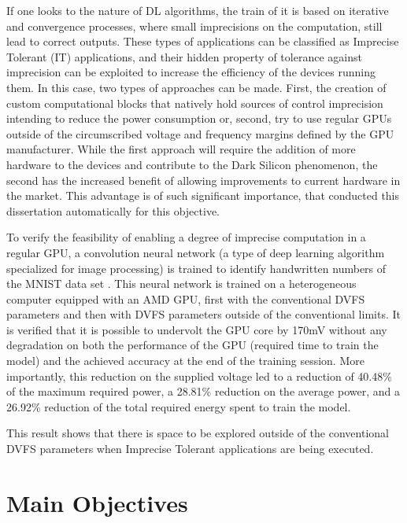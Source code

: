 If one looks to the nature of DL algorithms, the train of it is based on iterative and convergence processes, where small imprecisions on the computation, still lead to correct outputs. These types of applications can be classified as Imprecise Tolerant (IT) applications, and their hidden property of tolerance against imprecision can be exploited to increase the efficiency of the devices running them. In this case, two types of approaches can be made. First, the creation of custom computational blocks that natively hold sources of control imprecision intending to reduce the power consumption \cite{mahdiani_efficient_2017} or, second, try to use regular GPUs outside of the circumscribed voltage and frequency margins defined by the GPU manufacturer. While the first approach will require the addition of more hardware to the devices and contribute to the Dark Silicon phenomenon, the second has the increased benefit of allowing improvements to current hardware in the market. This advantage is of such significant importance, that conducted this dissertation automatically for this objective.

To verify the feasibility of enabling a degree of imprecise computation in a regular GPU, a convolution neural network (a type of deep learning algorithm specialized for image processing) is trained to identify handwritten numbers of the MNIST data set \cite{noauthor_mnist_nodate}. This neural network is trained on a heterogeneous computer equipped with an AMD GPU, first with the conventional DVFS parameters and then with DVFS parameters outside of the conventional limits. It is verified that it is possible to undervolt the GPU core by 170mV without any degradation on both the performance of the GPU (required time to train the model) and the achieved accuracy at the end of the training session. More importantly, this reduction on the supplied voltage led to a reduction of 40.48\% of the maximum required power, a 28.81\% reduction on the average power, and a 26.92\% reduction of the total required energy spent to train the model.

This result shows that there is space to be explored outside of the conventional DVFS parameters when Imprecise Tolerant applications are being executed.


\section{Main Objectives}
\label{section:objectives}

